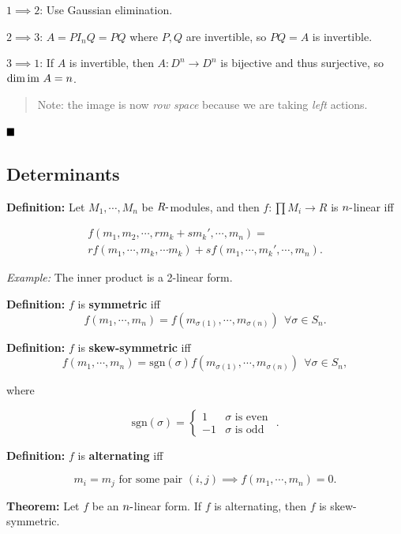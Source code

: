 \(1\implies 2\): Use Gaussian elimination.

\(2\implies 3\): \(A = PI_n Q = PQ\) where \(P, Q\) are invertible, so
\(PQ = A\) is invertible.

\(3\implies 1\): If \(A\) is invertible, then \(A: D^n \to D^n\) is
bijective and thus surjective, so \(\dim {\text{im}~} A = n\).

\begin{quote}
Note: the image is now \emph{row space} because we are taking
\emph{left} actions.
\end{quote}

\(\qed\)

\hypertarget{determinants}{%
\subsection{Determinants}\label{determinants}}

\textbf{Definition:} Let \(M_1, \cdots, M_n\) be \(R{\hbox{-}}\)modules, and
then \(f: \prod M_i \to R\) is \(n{\hbox{-}}\)linear iff

\begin{align*}
f(
m_1, m_2, \cdots, rm_k + sm_k', \cdots, m_n
) = \\
r f(
    m_1, \cdots, m_k, \cdots m_k) + sf(m_1, \cdots, m_k', \cdots, m_n
)
.\end{align*}

\emph{Example:} The inner product is a 2-linear form.

\textbf{Definition:} \(f\) is \textbf{symmetric} iff \[
f(m_1, \cdots, m_n) = f(m_{\sigma(1)}, \cdots, m_{\sigma(n)}) ~~\forall \sigma \in S_n
.\]

\textbf{Definition:} \(f\) is \textbf{skew-symmetric} iff \[
f(m_1, \cdots, m_n) = \mathrm{sgn}(\sigma) f(m_{\sigma(1)}, \cdots, m_{\sigma(n)}) ~~\forall \sigma \in S_n
,\]

where

\[
\mathrm{sgn}(\sigma) =
\begin{cases}
1 & \sigma \text{ is even } \\
-1 & \sigma \text{ is odd }
\end{cases}
.\]

\textbf{Definition:} \(f\) is \textbf{alternating} iff

\[
m_i = m_j \text{ for some pair } (i, j) \implies f(m_1, \cdots, m_n) = 0
.\]

\textbf{Theorem:} Let \(f\) be an \(n{\hbox{-}}\)linear form. If \(f\) is
alternating, then \(f\) is skew-symmetric.

